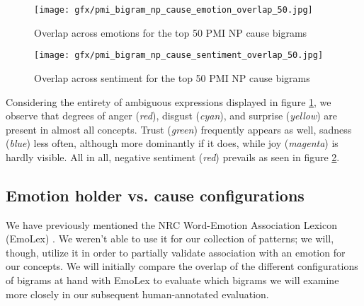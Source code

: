 \begin{figure}[bth]
\texttt{[image: gfx/pmi\_bigram\_np\_cause\_emotion\_overlap\_50.jpg]}
\caption{Overlap across emotions for the top 50 PMI NP cause bigrams}\label{fig:pmi-bigram-np-cause-emotion-overlap-50}
\end{figure}

\begin{figure}[bth]
\texttt{[image: gfx/pmi\_bigram\_np\_cause\_sentiment\_overlap\_50.jpg]}
\caption{Overlap across sentiment for the top 50 PMI NP cause bigrams}\label{fig:pmi-bigram-np-cause-sentiment-overlap-50}
\end{figure}

Considering the entirety of ambiguous expressions displayed in figure \ref{fig:pmi-bigram-np-cause-emotion-overlap-50}, we observe that degrees of anger (\textit{red}), disgust (\textit{cyan}), and surprise (\textit{yellow}) are present in almost all concepts. Trust (\textit{green}) frequently appears as well, sadness (\textit{blue}) less often, although more dominantly if it does, while joy (\textit{magenta}) is hardly visible. All in all, negative sentiment (\textit{red}) prevails as seen in figure \ref{fig:pmi-bigram-np-cause-sentiment-overlap-50}.

\subsection{Emotion holder vs. cause configurations} \label{sec:emolex-evaluation}

We have previously mentioned the NRC Word-Emotion Association Lexicon (EmoLex) \cite{nrc_emolex}. We weren't able to use it for our collection of patterns; we will, though, utilize it in order to partially validate association with an emotion for our concepts. We will initially compare the overlap of the different configurations of bigrams at hand with EmoLex to evaluate which bigrams we will examine more closely in our subsequent human-annotated evaluation.

